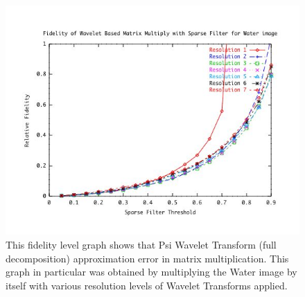 \begin{figure}
\includegraphics [width=6in]{waterResultsA.jpg}

\caption{This fidelity level graph shows that Psi Wavelet Transform (full decomposition) approximation error in matrix multiplication.  This graph in particular was obtained by multiplying the Water image by itself with various resolution levels of Wavelet Transforms applied.  \cite{watch} }
\label{image_waterfall_fidelity}
\end{figure}


